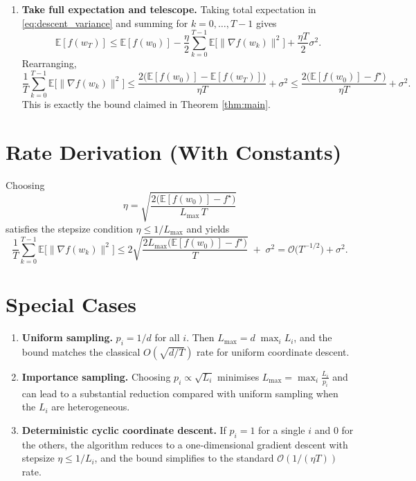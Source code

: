\documentclass{article}
\begin{document}
\begin{enumerate}
    \item[Step 7.] \textbf{Take full expectation and telescope.}
    Taking total expectation in \eqref{eq:descent_variance} and summing for $k=0,\dots,T-1$ gives
    \[
        \mathbb{E}[f(w_T)]
        \le \mathbb{E}[f(w_0)]
           -\frac{\eta}{2}\sum_{k=0}^{T-1}\mathbb{E}\!\bigl[\|\nabla f(w_k)\|^{2}\bigr]
           +\frac{\eta T}{2}\sigma^{2}.
    \]
    Rearranging,
    \[
        \frac{1}{T}\sum_{k=0}^{T-1}\mathbb{E}\!\bigl[\|\nabla f(w_k)\|^{2}\bigr]
        \le \frac{2\bigl(\mathbb{E}[f(w_0)]- \mathbb{E}[f(w_T)]\bigr)}{\eta T}
           +\sigma^{2}
        \le \frac{2\bigl(\mathbb{E}[f(w_0)]-f^\star\bigr)}{\eta T}
           +\sigma^{2}.
    \]
    This is exactly the bound claimed in Theorem \ref{thm:main}. \hfill\qedsymbol
\end{enumerate}

\section*{Rate Derivation (With Constants)}
Choosing
\[
    \eta = \sqrt{\frac{2\bigl(\mathbb{E}[f(w_0)]-f^\star\bigr)}{L_{\max}\,T}}
\]
satisfies the stepsize condition $\eta\le 1/L_{\max}$ and yields
\[
    \frac{1}{T}\sum_{k=0}^{T-1}\mathbb{E}\!\bigl[\|\nabla f(w_k)\|^{2}\bigr]
    \le
    2\sqrt{\frac{2L_{\max}\bigl(\mathbb{E}[f(w_0)]-f^\star\bigr)}{T}}
    \;+\;\sigma^{2}
    =\mathcal{O}\!\bigl(T^{-1/2}\bigr)+\sigma^{2}.
\]

\section*{Special Cases}
\begin{enumerate}
    \item \textbf{Uniform sampling.} $p_i=1/d$ for all $i$. Then $L_{\max}=d\;\max_i L_i$, and the bound matches the classical $O(\sqrt{d/T})$ rate for uniform coordinate descent.
    \item \textbf{Importance sampling.} Choosing $p_i\propto\sqrt{L_i}$ minimises $L_{\max}= \max_i\frac{L_i}{p_i}$ and can lead to a substantial reduction compared with uniform sampling when the $L_i$ are heterogeneous.
    \item \textbf{Deterministic cyclic coordinate descent.} If $p_i=1$ for a single $i$ and $0$ for the others, the algorithm reduces to a one‑dimensional gradient descent with stepsize $\eta\le 1/L_i$, and the bound simplifies to the standard $\mathcal{O}(1/(\eta T))$ rate.
\end{enumerate}
\end{document}
